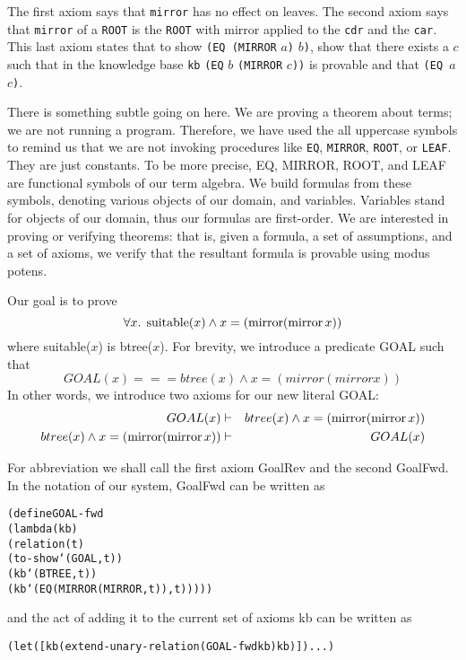 The first axiom says that \texttt{mirror} has no effect on leaves.
The second axiom says that \texttt{mirror} of a \texttt{ROOT} is the
\texttt{ROOT} with mirror applied to the \texttt{cdr} and the
\texttt{car}.  This last axiom states that to show \texttt{(EQ
(MIRROR} $a$\texttt{)} $b$\texttt{)}, show that there exists a $c$
such that in the knowledge base \texttt{kb}
\texttt{(EQ} $b$ \texttt{(MIRROR} $c$\texttt{))} is provable and that
\texttt{(EQ $a$ $c$)}.

There is something subtle going on here.  We are proving a theorem
about terms; we are not running a program.  Therefore, we have used
the all uppercase symbols to remind us that we are not invoking
procedures like \texttt{EQ}, \texttt{MIRROR}, \texttt{ROOT}, or
\texttt{LEAF}.  They are just constants.
To be more precise, EQ, MIRROR, ROOT, and LEAF are functional symbols
of our term algebra. We build formulas from these symbols,
denoting various objects of our domain, and variables. Variables stand
for objects of our domain, thus our formulas are first-order. We are
interested in proving or verifying theorems: that is, given a
formula, a set of assumptions, and a set of axioms, we verify that the
resultant formula is provable using modus potens.

Our goal is to prove
$$\forall x. \; \mathop{\mathrm{suitable}}(x) \wedge x = (\mathop{\mathrm{mirror}} (\mathop{\mathrm{mirror}} x))$$
where suitable($x$) is btree($x$). For brevity, we introduce a predicate
GOAL such that
$$GOAL(x) === btree(x) \wedge x = (mirror (mirror x))$$
In other words, we introduce two axioms for our new literal GOAL:
\begin{eqnarray*}
	GOAL(x) &\vdash& btree(x) \wedge x = (\mathop{\mathrm{mirror}} (\mathop{\mathrm{mirror}} x))\\
	btree(x) \wedge x = (\mathop{\mathrm{mirror}} (\mathop{\mathrm{mirror}} x)) &\vdash& GOAL(x)
\end{eqnarray*}

\noindent For abbreviation we shall call the first axiom GoalRev and the second GoalFwd.  In the notation of our system, GoalFwd can be written as

\begin{alltt}
(define GOAL-fwd
  (lambda (kb)
    (relation (t)
      (to-show `(GOAL ,t))
      (kb `(BTREE ,t))
      (kb `(EQ (MIRROR (MIRROR ,t)) ,t)))))
\end{alltt}
and the act of adding it to the current set of axioms kb can be
written as
\begin{alltt}
(let ([kb (extend-unary-relation (GOAL-fwd kb) kb)]) ...)
\end{alltt}

